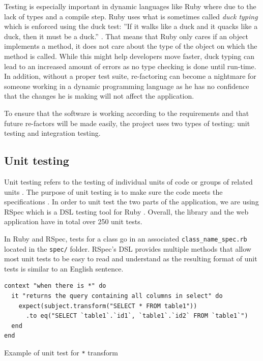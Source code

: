 Testing is especially important in dynamic languages like Ruby where due to the lack of types and a compile step. Ruby uses what is sometimes called \textit{duck typing} which is enforced using the duck test: ''If it walks like a duck and it quacks like a duck, then it must be a duck.'' \citep{wiki:duck_typing}. That means that Ruby only cares if an object implements a method, it does not care about the type of the object on which the method is called. While this might help developers move faster, duck typing can lead to an increased amount of errors as no type checking is done until run-time. In addition, without a proper test suite, re-factoring can become a nightmare for someone working in a dynamic programming language as he has no confidence that the changes he is making will not affect the application.

To ensure that the software is working according to the requirements and that future re-factors will be made easily, the project uses two types of testing: unit testing and integration testing.


\subsection{Unit testing}

Unit testing refers to the testing of individual units of code or groups of related units \citep{unit_testing}. The purpose of unit testing is to make sure the code meets the specifications \citep{Olan2003}. In order to unit test the two parts of the application, we are using RSpec which is a DSL testing tool for Ruby \citep{wiki:rspec}. Overall, the library and the web application have in total over 250 unit tests.

In Ruby and RSpec, tests for a class go in an associated \texttt{class\_name\_spec.rb} located in the \texttt{spec/} folder. RSpec's DSL provides multiple methods that allow most unit tests to be easy to read and understand as the resulting format of unit tests is similar to an English sentence.

\begin{listing}[H]
\begin{verbatim}
context "when there is *" do
  it "returns the query containing all columns in select" do
    expect(subject.transform("SELECT * FROM table1"))
      .to eq("SELECT `table1`.`id1`, `table1`.`id2` FROM `table1`")
  end
end
\end{verbatim}
\caption{Example of unit test for \texttt{*} transform}
\label{fig:example_unit_test}
\end{listing}


